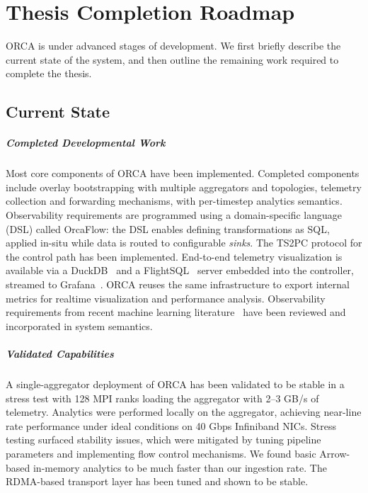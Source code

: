 \chapter{Thesis Completion Roadmap}
\label{chap:timeline}

ORCA is under advanced stages of development.
We first briefly describe the current state of the system, and then outline the remaining work
required to complete the thesis.

\section{Current State}

\paragraph{Completed Developmental Work}
Most core components of ORCA have been implemented.
Completed components include overlay bootstrapping with multiple aggregators and topologies,
telemetry collection and forwarding mechanisms, with per-timestep analytics semantics.
Observability requirements are programmed using a domain-specific language (DSL) called OrcaFlow:
the DSL enables defining transformations as SQL, applied in-situ while data is routed to
configurable \emph{sinks}.
The TS2PC protocol for the control path has been implemented.
End-to-end telemetry visualization is available via a DuckDB~\cite{Raasv2019:DuckDB} and a
FlightSQL~\cite{:ArrowFlightSQL} server embedded into the controller, streamed to
Grafana~\cite{:GrafanaDashboard}.
ORCA reuses the same infrastructure to export internal metrics for realtime visualization and
performance analysis.
Observability requirements from recent machine learning
literature~\cite{Jiang2025:TrainingwithConfidence} have been reviewed and incorporated in system
semantics.

\paragraph{Validated Capabilities}
A single-aggregator deployment of ORCA has been validated to be stable in a stress test with 128
MPI ranks loading the aggregator with 2--3 GB/s of telemetry.
Analytics were performed locally on the aggregator, achieving near-line rate performance under
ideal conditions on 40 Gbps Infiniband NICs.
Stress testing surfaced stability issues, which were mitigated by tuning pipeline parameters and
implementing flow control mechanisms.
We found basic Arrow-based in-memory analytics to be much faster than our ingestion rate.
The RDMA-based transport layer has been tuned and shown to be stable.

